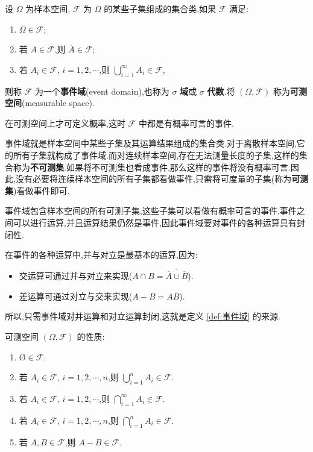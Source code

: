 \begin{definition}
    \indent 设 $\varOmega$ 为样本空间, $\mathcal{F}$ 为 $\varOmega$ 的某些子集组成的集合类.如果 $\mathcal{F}$ 满足:
    \begin{enumerate}
        \item $\varOmega \in \mathcal{F}$;
        \item 若 $A \in \mathcal{F}$,则 $\overline{A} \in \mathcal{F}$;
        \item 若 $A_i \in \mathcal{F}, \, i=1,2,\cdots$,则 $\displaystyle\bigcup_{i=1}^\infty A_i \in \mathcal{F}$,
    \end{enumerate}
    则称 $\mathcal{F}$ 为一个\textbf{事件域}(event domain),也称为 $\sigma$ \textbf{域}或 $\sigma$ \textbf{代数}.将 $(\varOmega, \mathcal{F})$ 称为\textbf{可测空间}(measurable space).
\end{definition}

在可测空间上才可定义概率,这时 $\mathcal{F}$ 中都是有概率可言的事件.

\begin{note}
    \indent 事件域就是样本空间中某些子集及其运算结果组成的集合类.对于离散样本空间,它的所有子集就构成了事件域.而对连续样本空间,存在无法测量长度的子集,这样的集合称为\textbf{不可测集}.如果将不可测集也看成事件,那么这样的事件将没有概率可言.因此,没有必要将连续样本空间的所有子集都看做事件,只需将可度量的子集(称为\textbf{可测集})看做事件即可.

    \indent 事件域包含样本空间的所有可测子集,这些子集可以看做有概率可言的事件.事件之间可以进行运算,并且运算结果仍然是事件,因此事件域要对事件的各种运算具有封闭性.

    \indent 在事件的各种运算中,并与对立是最基本的运算,因为:
    \begin{itemize}
        \item 交运算可通过并与对立来实现($A \cap B = \overline{\overline{A} \cup \overline{B}}$).
        \item 差运算可通过对立与交来实现($A-B = A \overline{B}$).
    \end{itemize}
    所以,只需事件域对并运算和对立运算封闭,这就是定义 \ref{def:事件域} 的来源.
\end{note}

\begin{property}
    \indent 可测空间 $(\varOmega, \mathcal{F})$ 的性质:
    \begin{enumerate}
        \item $\text{\O} \in \mathcal{F}$.
        \item 若 $A_i \in \mathcal{F}, \, i=1,2,\cdots,n$,则 $\displaystyle\bigcup_{i=1}^n A_i \in \mathcal{F}$.
        \item 若 $A_i \in \mathcal{F}, \, i=1,2,\cdots$,则 $\displaystyle\bigcap_{i=1}^{\infty} A_i \in \mathcal{F}$.
        \item 若 $A_i \in \mathcal{F}, \, i=1,2,\cdots,n$,则 $\displaystyle\bigcap_{i=1}^n A_i \in \mathcal{F}$.
        \item 若 $A,B \in \mathcal{F}$,则 $A-B \in \mathcal{F}$.
    \end{enumerate}
\end{property}


